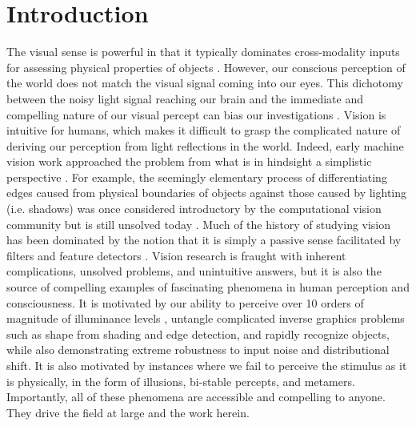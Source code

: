 \chapter{Introduction}
The visual sense is powerful in that it typically dominates cross-modality inputs for assessing physical properties of objects \parencite{ernst2002humans}. However, our conscious perception of the world does not match the visual signal coming into our eyes. This dichotomy between the noisy light signal reaching our brain and the immediate and compelling nature of our visual percept can bias our investigations \parencite{rodieck1998first}. Vision is intuitive for humans, which makes it difficult to grasp the complicated nature of deriving our perception from light reflections in the world. Indeed, early machine vision work approached the problem from what is in hindsight a simplistic perspective \parencite{papert1966summer}. For example, the seemingly elementary process of differentiating edges caused from physical boundaries of objects against those caused by lighting (i.e. shadows) was once considered introductory by the computational vision community but is still unsolved today \parencite{adelson2000lightness, barron2012shape}. Much of the history of studying vision has been dominated by the notion that it is simply a passive sense facilitated by filters and feature detectors \parencite{olshausen201320}. Vision research is fraught with inherent complications, unsolved problems, and unintuitive answers, but it is also the source of compelling examples of fascinating phenomena in human perception and consciousness. It is motivated by our ability to perceive over 10 orders of magnitude of illuminance levels \parencite{norton2002psychophysical}, untangle complicated inverse graphics problems such as shape from shading and edge detection, and rapidly recognize objects, while also demonstrating extreme robustness to input noise and distributional shift. It is also motivated by instances where we fail to perceive the stimulus as it is physically, in the form of illusions, bi-stable percepts, and metamers. Importantly, all of these phenomena are accessible and compelling to anyone. They drive the field at large and the work herein.

